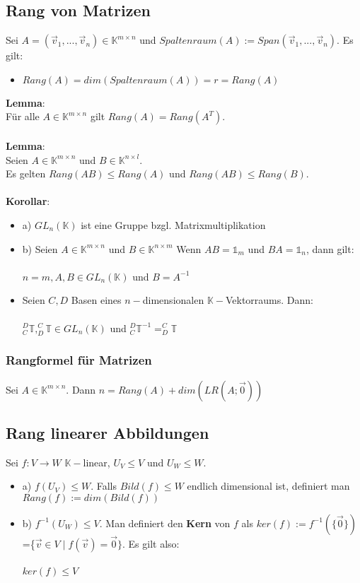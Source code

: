 \documentclass[titlepage]{article}
\newcommand{\K}{\mathbb{K}}
\newcommand{\1}{\mathbb{1}}
\newcommand{\0}{\mathbb{0}}
\newcommand{\T}{\mathbb{T}}
\begin{document}
			\subsection{Rang von Matrizen}
				Sei $A=(\vec{v}_1,...,\vec{v}_n)\in\K^{m\times n}$ und $Spaltenraum(A):=Span(\vec{v}_1,...,\vec{v}_n)$. Es gilt:
				\begin{itemize}
					\item $Rang(A)=dim(Spaltenraum(A))=r=Rang(A)$
				\end{itemize}
				\textbf{Lemma}:\\
				Für alle $A\in\K^{m\times n}$ gilt $Rang(A)=Rang(A^T)$.\\
				\\
				\textbf{Lemma}:\\
				Seien $A\in\K^{m\times n}$ und $B\in\K^{n\times l}$.\\
				Es gelten $Rang(AB)\le Rang(A)$ und $Rang(AB)\le Rang(B)$.\\
				\\
				\textbf{Korollar}:\\
				\begin{itemize}
					\item a) $GL_n(\K)$ ist eine Gruppe bzgl. Matrixmultiplikation
					\item b) Seien $A\in\K^{m\times n}$ und $B\in\K^{n\times m}$ Wenn $AB=\1_m$ und $BA=\1_n$, dann gilt:\\\\ $n=m,A,B\in GL_n(\K)$ und $B=A^{-1}$
					\item Seien $C,D$ Basen eines $n-$dimensionalen $\K-$Vektorraums.
					Dann:\\\\ $^D_C\T,^C_D\T\in GL_n(\K)$ und $^D_C\T^{-1}=^C_D\T$
				\end{itemize}
				\subsubsection{Rangformel für Matrizen}
					Sei $A\in\K^{m\times n}$. Dann $n=Rang(A)+dim\left(LR(A;\vec{0})\right)$
			\subsection{Rang linearer Abbildungen}
				Sei $f:V\rightarrow W$ $\K-$linear, $U_V\le V$ und $U_W\le W$.
				\begin{itemize}
					\item a) $f(U_V)\le W$. Falls $Bild(f)\le W$ endlich dimensional ist, definiert man $Rang(f):=dim(Bild(f))$
					\item b) $f^{-1}(U_W)\le V$. Man definiert den \textbf{Kern} von $f$ als $ker(f):=f^{-1}(\{\vec{0}\})$=\{$\vec{v}\in V\mid f(\vec{v})=\vec{0}\}$. Es gilt also:\\\\
					$ker(f)\le V$
				\end{itemize}
\end{document}
